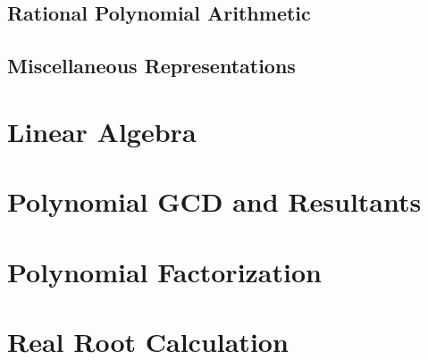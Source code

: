 \documentclass{report}
\begin{document}


\section{Rational Polynomial Arithmetic}
\label{c:PA s:RPA}



\section{Miscellaneous Representations}
\label{c:PA s:MR}




\chapter{Linear Algebra}
\label{c:LA}




\chapter{Polynomial GCD and Resultants}
\label{c:GCD}




\chapter{Polynomial Factorization}
\label{c:PF}




\chapter{Real Root Calculation}
\label{c:RRC}




\end{document}
